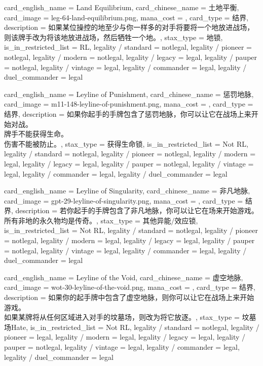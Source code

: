 \documentclass[lang = cn, color = black, 10pt]{AllThatStax}
\begin{document}
\card
{
	card_english_name = {Land Equilibrium},
	card_chinese_name = {土地平衡},
	card_image = leg-64-land-equilibrium.png,
	mana_cost = ,
	card_type = 结界,
	description = {如果某位操控的地至少与你一样多的对手将要将一个地放进战场，则该牌手改为将该地放进战场，然后牺牲一个地。},
	stax_type = 地锁,
	is_in_restricted_list = RL,
	legality / standard = notlegal,
	legality / pioneer = notlegal,
	legality / modern = notlegal,
	legality / legacy = legal,
	legality / pauper = notlegal,
	legality / vintage = legal,
	legality / commander = legal,
	legality / duel_commander = legal
}

\card
{
	card_english_name = {Leyline of Punishment},
	card_chinese_name = {惩罚地脉},
	card_image = m11-148-leyline-of-punishment.png,
	mana_cost = ,
	card_type = 结界,
	description = {如果你起手的手牌包含了惩罚地脉，你可以让它在战场上来开始对战。\\
牌手不能获得生命。\\
伤害不能被防止。},
	stax_type = 获得生命锁,
	is_in_restricted_list = Not RL,
	legality / standard = notlegal,
	legality / pioneer = notlegal,
	legality / modern = legal,
	legality / legacy = legal,
	legality / pauper = notlegal,
	legality / vintage = legal,
	legality / commander = legal,
	legality / duel_commander = legal
}

\card
{
	card_english_name = {Leyline of Singularity},
	card_chinese_name = {非凡地脉},
	card_image = gpt-29-leyline-of-singularity.png,
	mana_cost = ,
	card_type = 结界,
	description = {若你起手的手牌包含了非凡地脉，你可以让它在场来开始游戏。\\
所有非地的永久物均是传奇。},
	stax_type = 其他异能/效应锁,
	is_in_restricted_list = Not RL,
	legality / standard = notlegal,
	legality / pioneer = notlegal,
	legality / modern = legal,
	legality / legacy = legal,
	legality / pauper = notlegal,
	legality / vintage = legal,
	legality / commander = legal,
	legality / duel_commander = legal
}

\card
{
	card_english_name = {Leyline of the Void},
	card_chinese_name = {虚空地脉},
	card_image = wot-30-leyline-of-the-void.png,
	mana_cost = ,
	card_type = 结界,
	description = {如果你的起手牌中包含了虚空地脉，则你可以让它在战场上来开始游戏。\\
如果某牌将从任何区域进入对手的坟墓场，则改为将它放逐。},
	stax_type = 坟墓场Hate,
	is_in_restricted_list = Not RL,
	legality / standard = notlegal,
	legality / pioneer = legal,
	legality / modern = legal,
	legality / legacy = legal,
	legality / pauper = notlegal,
	legality / vintage = legal,
	legality / commander = legal,
	legality / duel_commander = legal
}
\end{document}

